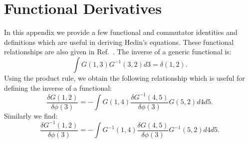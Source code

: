 \chapter{Functional Derivatives}
\label{app:funcdiv}
In this appendix we provide a few functional and commutator identities and 
definitions which are useful in deriving Hedin's equations.
These functional relationships are also given in Ref.~\cite{strinati88}.
%
%
The inverse of a generic functional is:
%
\begin{equation}
\int G(1,3)G^{-1}(3,2)d3 =\delta(1,2).
\end{equation}
%
Using the product rule, we obtain the following relationship
which is useful for defining the inverse of a functional:  
%
\begin{equation}
\label{eq:expansionrule}
\frac{\delta G(1,2)}{\delta \phi(3)} = - \int G(1,4)\frac{\delta G^{-1}(4,5)}{\delta \phi(3)} G(5,2) d4 d5.
\end{equation}
%
Similarly we find:
%
\begin{equation}
\label{eq:expansionrule}
\frac{\delta G^{-1}(1,2)}{\delta \phi(3)} = - \int G^{-1}(1,4)\frac{\delta G(4,5)}{\delta \phi(3)} G^{-1}(5,2) d4 d5.
\end{equation}


